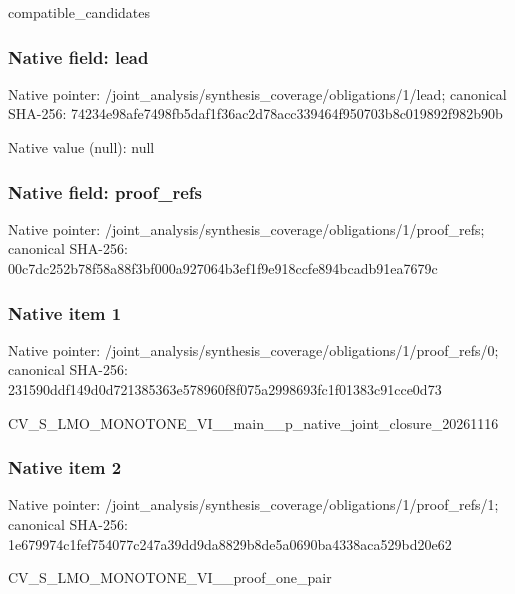 \documentclass[10pt,a4paper]{article}
\begin{document}
\begingroup\raggedright\sloppy compatible\_\allowbreak{}candidates\par\endgroup

\subsubsection{Native field: lead}
Native pointer: /joint\_\allowbreak{}analysis/synthesis\_\allowbreak{}coverage/obligations/1/lead; canonical SHA-256: 74234e98afe7498fb5daf1f36ac2d78acc339464f950703b8c019892f982b90b

Native value (null): null

\subsubsection{Native field: proof\_\allowbreak{}refs}
Native pointer: /joint\_\allowbreak{}analysis/synthesis\_\allowbreak{}coverage/obligations/1/proof\_\allowbreak{}refs; canonical SHA-256: 00c7dc252b78f58a88f3bf000a927064b3ef1f9e918ccfe894bcadb91ea7679c

\subsubsection{Native item 1}
Native pointer: /joint\_\allowbreak{}analysis/synthesis\_\allowbreak{}coverage/obligations/1/proof\_\allowbreak{}refs/0; canonical SHA-256: 231590ddf149d0d721385363e578960f8f075a2998693fc1f01383c91cce0d73

\begingroup\raggedright\sloppy CV\_\allowbreak{}S\_\allowbreak{}LMO\_\allowbreak{}MONOTONE\_\allowbreak{}VI\_\allowbreak{}\_\allowbreak{}main\_\allowbreak{}\_\allowbreak{}p\_\allowbreak{}native\_\allowbreak{}joint\_\allowbreak{}closure\_\allowbreak{}20261116\par\endgroup

\subsubsection{Native item 2}
Native pointer: /joint\_\allowbreak{}analysis/synthesis\_\allowbreak{}coverage/obligations/1/proof\_\allowbreak{}refs/1; canonical SHA-256: 1e679974c1fef754077c247a39dd9da8829b8de5a0690ba4338aca529bd20e62

\begingroup\raggedright\sloppy CV\_\allowbreak{}S\_\allowbreak{}LMO\_\allowbreak{}MONOTONE\_\allowbreak{}VI\_\allowbreak{}\_\allowbreak{}proof\_\allowbreak{}one\_\allowbreak{}pair\par\endgroup
\end{document}
